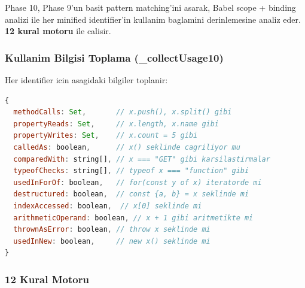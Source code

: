 Phase 10, Phase 9'un basit pattern matching'ini asarak, Babel scope + binding analizi ile her minified identifier'in kullanim baglamini derinlemesine analiz eder. \textbf{12 kural motoru} ile calisir.

\subsubsection{Kullanim Bilgisi Toplama (\_collectUsage10)}

Her identifier icin asagidaki bilgiler toplanir:

\begin{lstlisting}[language=JavaScript, caption={Usage bilgi yapisi}]
{
  methodCalls: Set,       // x.push(), x.split() gibi
  propertyReads: Set,     // x.length, x.name gibi
  propertyWrites: Set,    // x.count = 5 gibi
  calledAs: boolean,      // x() seklinde cagriliyor mu
  comparedWith: string[], // x === "GET" gibi karsilastirmalar
  typeofChecks: string[], // typeof x === "function" gibi
  usedInForOf: boolean,   // for(const y of x) iteratorde mi
  destructured: boolean,  // const {a, b} = x seklinde mi
  indexAccessed: boolean,  // x[0] seklinde mi
  arithmeticOperand: boolean, // x + 1 gibi aritmetikte mi
  thrownAsError: boolean, // throw x seklinde mi
  usedInNew: boolean,     // new x() seklinde mi
}
\end{lstlisting}

\subsubsection{12 Kural Motoru}

